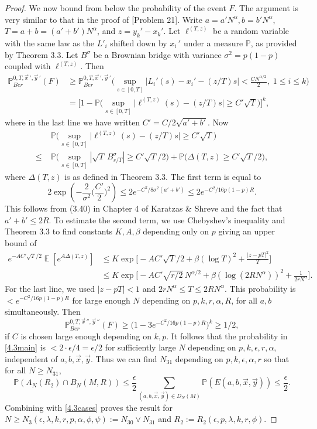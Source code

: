 \documentclass[12pt]{article}
\DeclareMathOperator{\ex}{\mathbb{E}}
\begin{document}
\begin{proof}
		We now bound from below the probability of the event $F$. The argument is very similar to that in the proof of [Problem 21]. Write $a = a'N^\alpha, b = b'N^\alpha$, $T = a+b = (a'+b')N^\alpha$, and $z = y_k' - x_k'$. Let $\ell^{(T,z)}$ be a random variable with the same law as the $L'_i$ shifted down by $x_i\,'$ under a measure $\mathbb{P}$, as provided by Theorem 3.3. Let $B^{\sigma}$ be a Brownian bridge with variance $\sigma^2 = p(1-p)$ coupled with $\ell^{(T,z)}$. Then
		\begin{align*}
		\mathbb{P}^{0,T,\vec{x}\,', \vec{y}\,'}_{Ber}(F) &\geq \mathbb{P}^{0,T,\vec{x}\,', \vec{y}\,'}_{Ber} \Big( \sup_{s\in[0,T]} \Big|L_i'(s) - x_i' - (z/T)s\Big| < \frac{CN^{\alpha/2}}{2},\; 1\leq i\leq k \Big)\\
		&= \Big[ 1 - \mathbb{P} \Big( \sup_{s\in[0,T]} \Big|\ell^{(T,z)}(s) - (z/T)s\Big| \geq C'\sqrt{T} \Big) \Big]^k,
		\end{align*}
		where in the last line we have written $C' = C/2\sqrt{a'+b'}$. Now
		\begin{align*}
		&\mathbb{P} \Big( \sup_{s\in[0,T]} \Big|\ell^{(T,z)}(s) - (z/T)s\Big| \geq C'\sqrt{T} \Big)\\
		\leq \; & \mathbb{P} \Big( \sup_{s\in[0,T]} |\sqrt{T}\,B^{\sigma}_{s/T}| \geq C'\sqrt{T}/2\Big) + \mathbb{P} \Big( \Delta(T,z) \geq C'\sqrt{T}/2 \Big),
		\end{align*}
		where $\Delta(T,z)$ is as defined in Theorem 3.3. The first term is equal to
		\[
		2\exp\left( - \frac{2}{\sigma^2}\Big(\frac{C'}{2}\Big)^2\right) \leq 2e^{-C^2/8\sigma^2(a'+b')} \leq 2e^{-C^2/16p(1-p)R}.
		\]
		This follows from (3.40) in Chapter 4 of Karatzas \& Shreve and the fact that $a'+b'\leq 2R$. To estimate the second term, we use Chebyshev's inequality and Theorem 3.3 to find constants $K,A,\beta$ depending only on $p$ giving an upper bound of
		\begin{align*}
		e^{-AC'\sqrt{T}/2}\ex[e^{A\Delta(T,z)}] &\leq K\exp\Big[-AC'\sqrt{T}/2 + \beta(\log T)^2 + \frac{|z-pT|^2}{T}\Big]\\
		&\leq K\exp\Big[ -AC'\sqrt{r/2}\,N^{\alpha/2} + \beta(\log (2RN^\alpha))^2 + \frac{1}{2rN^{\alpha}}\Big].
		\end{align*}
		For the last line, we used $|z-pT| < 1$ and $2rN^\alpha \leq T \leq 2RN^\alpha$. This probability is $< e^{-C^2/16p(1-p)R}$ for large enough $N$ depending on $p,k,r,\alpha,R$, for all $a,b$ simultaneously. Then
		\[
		\mathbb{P}^{0,T,\vec{x}\,'',\vec{y}\,''}_{Ber}(F) \geq \big(1 - 3e^{-C^2/16p(1-p)R}\big)^k \geq 1/2,
		\]
		if $C$ is chosen large enough depending on $k,p$.	It follows that the probability in \eqref{4.3main} is $< 2\cdot \epsilon/4 = \epsilon/2$ for sufficiently large $N$ depending on $p,k,\epsilon,r,\alpha$, independent of $a,b,\vec{x},\vec{y}$. Thus we can find $N_{31}$ depending on $p,k,\epsilon,\alpha,r$ so that for all $N\geq N_{31}$,
		\[
		\mathbb{P}(A_N(R_2)\cap B_N(M,R)) \leq \frac{\epsilon}{2}\sum_{(a,b,\vec{x},\vec{y})\in D_N(M)} \mathbb{P}(E(a,b,\vec{x},\vec{y})) \leq \frac{\epsilon}{2}.
		\]
		Combining with \eqref{4.3cases} proves the result for $N\geq N_3(\epsilon,\lambda,k,r,p,\alpha,\phi,\psi) := N_{30} \vee N_{31}$ and $R_2 := R_2(\epsilon,p,\lambda,k,r,\phi)$.
		

\end{proof}
\end{document}
